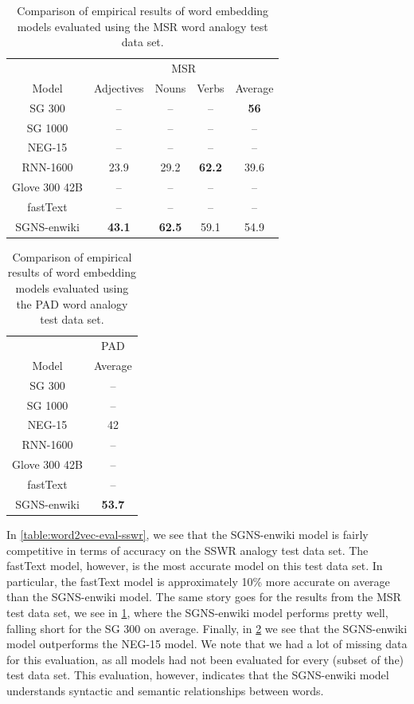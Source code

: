 \begin{table}[H]
     \centering
    \begin{tabular}{@{}ccccc@{}}
    \toprule
    & \multicolumn{4}{c}{MSR} \\
    \cmidrule(l){2-5} 
    \multirow{-2}{*}{Model} & Adjectives & Nouns & Verbs & Average \\
    \midrule
    \trcolor
    SG 300 & -- & -- & -- & \textbf{56} \\
    SG 1000 & -- & -- & -- & -- \\
    \trcolor
    NEG-15 & -- & -- & -- & -- \\
    RNN-1600 & 23.9 & 29.2 & \textbf{62.2} & 39.6 \\
    \trcolor
    Glove 300 42B & -- & -- & -- & -- \\
    fastText & -- & -- & -- & -- \\
    \trcolor
    SGNS-enwiki & \textbf{43.1} & \textbf{62.5} & 59.1 & 54.9 \\
    \bottomrule
    \end{tabular}
    \caption{Comparison of empirical results of word embedding models evaluated using the MSR word analogy test data set.}
    \label{table:word2vec-eval-msr}
\end{table}
\begin{table}[H]
    \centering
    \begin{tabular}{@{}cc@{}}
    \toprule
    & PAD \\
    \cmidrule(l){2-2}
    \multirow{-2}{*}{Model} & Average \\
    \midrule
    \trcolor
    SG 300 & -- \\
    SG 1000 & -- \\
    \trcolor
    NEG-15 & 42 \\
    RNN-1600 & -- \\
    \trcolor
    Glove 300 42B & -- \\
    fastText & -- \\
    \trcolor
    SGNS-enwiki & \textbf{53.7} \\
    \bottomrule
    \end{tabular}
    \caption{Comparison of empirical results of word embedding models evaluated using the PAD word analogy test data set.}
    \label{table:word2vec-eval-pad}
\end{table}

In \cref{table:word2vec-eval-sswr}, we see that the SGNS-enwiki model is fairly competitive in terms of accuracy on the SSWR analogy test data set. The fastText model, however, is the most accurate model on this test data set. In particular, the fastText model is approximately 10\% more accurate on average than the SGNS-enwiki model. The same story goes for the results from the MSR test data set, we see in \cref{table:word2vec-eval-msr}, where the SGNS-enwiki model performs pretty well, falling short for the SG 300 on average. Finally, in \cref{table:word2vec-eval-pad} we see that the SGNS-enwiki model outperforms the NEG-15 model. We note that we had a lot of missing data for this evaluation, as all models had not been evaluated for every (subset of the) test data set. This evaluation, however, indicates that the SGNS-enwiki model understands syntactic and semantic relationships between words.

